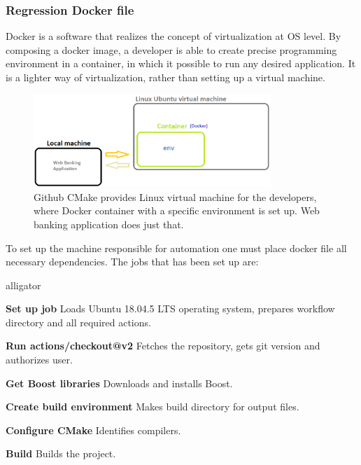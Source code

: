 \documentclass[a4paper,12pt]{book}
\newcommand\tab[1][1cm]{\hspace*{#1}}
\begin{document}
\subsubsection{Regression Docker file}
{
\tab Docker is a software that realizes the concept of virtualization at OS level. By composing a docker image, a developer is able to create precise programming environment in a container, in which it possible to run any desired application. It is a lighter way of virtualization, rather than setting up a virtual machine.      

\begin{figure}[h]
  \centering
    \includegraphics[width=0.8\textwidth]{scheme}
    \caption{Github CMake provides Linux virtual machine for the developers, where Docker container with a specific environment is set up. Web banking application does just that.}
\end{figure} 
    
\bigskip 
To set up the machine responsible for automation one must place docker file all necessary dependencies. The jobs that has been set up are: 
    
\begin{labeling}{alligator}
\item [\textbf{Set up job}] Loads Ubuntu 18.04.5 LTS operating system, prepares workflow directory and all required actions.

\item [\textbf{Run actions/checkout@v2}] Fetches the repository, gets git version and authorizes user.

\item [\textbf{Get Boost libraries}] Downloads and installs Boost.

\item [\textbf{Create build environment}] Makes build directory for output files.

\item [\textbf{Configure CMake}] Identifies compilers.

\item [\textbf{Build}] Builds the project.


\end{labeling}}
\end{document}
